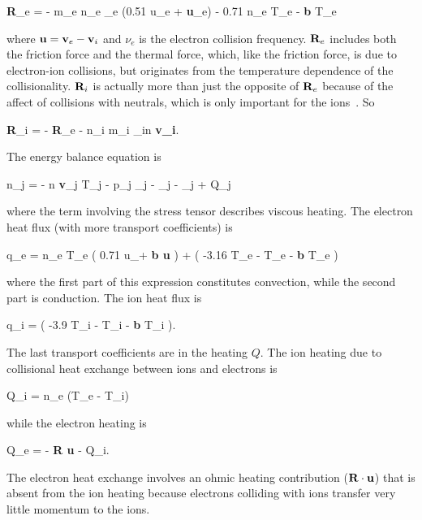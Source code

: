 \beq
\label{R_e}
{\bf R}_e = - m_e n_e \nu_e (0.51 u_{\para e} + {\bf u}_{\perp e}) - 0.71 n_e \gradpar T_e -   {\bf b \times} \grad T_e
\eeq

where ${\bf u} = {\bf v}_e - {\bf v}_i$ and $\nu_e$ is the electron collision frequency. ${\bf R}_e$ includes both the friction force and the thermal force, which, like the friction
force, is due to electron-ion collisions, but originates from the temperature dependence of the collisionality. ${\bf R}_i$ is actually more than just the opposite of ${\bf R}_e$ because
of the affect of collisions with neutrals, which is only important for the ions~\cite{Popovich2010a}. So

\beq
\label{R_i}
{\bf R}_i = - {\bf R}_e - n_i m_i \nu_{in} {\bf v_i}.
\eeq

The energy balance equation is

\beq
\label{brag_ener}
 n_j  = - n {\bf v}_j \cdot \grad T_j - p_j \grad {}_j - \grad {}_j - \Pi_{j \alpha \beta}  + Q_j
\eeq

where the term involving the stress tensor describes viscous heating. The electron heat flux (with more transport coefficients) is

\beq
\label{elec_heat_flux}
q_e = n_e T_e \left( 0.71 u_\para +  {\bf b \times u} \right) +  \left( -3.16 \gradpar T_e -  \gradperp T_e -  {\bf b \times} \grad T_e \right)
\eeq

where the first part of this expression constitutes convection, while the second part is conduction. The ion heat flux is

\beq
\label{ion_heat_flux}
q_i =  \left( -3.9 \gradpar T_i -  \gradperp T_i -  {\bf b \times} \grad T_i \right).
\eeq

The last transport coefficients are in the heating $Q$. The ion heating due to collisional heat exchange between ions and electrons is

\beq
\label{ion_heat_exchange}
Q_i =  n_e \nue (T_e - T_i)
\eeq

while the electron heating is

\beq
\label{electron_heat_exchange}
Q_e = - {\bf R \cdot u} - Q_i.
\eeq

The electron heat exchange involves an ohmic heating contribution (${\bf R \cdot u}$) that is absent from the ion heating because electrons colliding with ions transfer very
little momentum to the ions.

